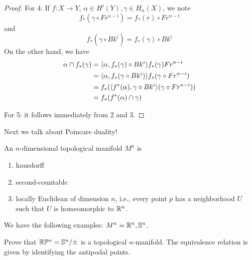 \begin{proof}
    For 4: If $f:X\to Y$, $\alpha\in H^i(Y), \gamma\in H_n(X)$, we note 
    \begin{equation*}
        f_*(\gamma\circ Fr^{n-i})=f_*(r)\circ Fr^{n-i}
    \end{equation*}
    and 
    \begin{equation*}
        f_*(\gamma\circ Bk^i)=f_*(\gamma)\circ Bk^i
    \end{equation*}
    On the other hand, we have 
    \begin{align*}
        \alpha\cap f_*(\gamma)&=\langle\alpha,f_*(\gamma)\circ Bk^i\rangle f_*(\gamma)Fr^{n-i}\\
        &=\langle \alpha, f_*(\gamma\circ Bk^i)\rangle f_*(\gamma\circ Fr^{n-i})\\
        &=f_*(\langle f^*(\alpha),\gamma\circ Bk^i\rangle(\gamma\circ Fr^{n-i}))\\
        &=f_*(f^*(\alpha)\cap\gamma)
    \end{align*}

    For 5: it follows immediately from 2 and 3.
\end{proof}


Next we talk about Poincare duality! 
\begin{defn}
    An $n$-dimensional topological manifold $M^n$ is 
    \begin{enumerate}
        \item hausdorff
        \item second-countable
        \item locally Euclidean of dimension $n$, i.e., every point $p$ has a neighborhood $U$ such that $U$ is homeomorphic to $\mathbb{R}^n$.
    \end{enumerate}
\end{defn}
We have the following examples: $M^n=\mathbb{R}^n, \mathbb{S}^n$. 
\begin{prob}[HW(4.1)]
    Prove that $\mathbb{R}\mathbb{P}^n=\mathbb{S}^n/\pm$ is a topological $n$-manifold. The equivalence relation is given by identifying the antipodal points.
\end{prob}

